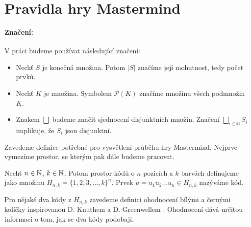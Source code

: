 \chapter{Pravidla hry Mastermind}

\subsubsection{Značení:}
V práci budeme používat následující značení:
\begin{itemize}
    \item Nechť $S$ je konečná množina. Potom $|S|$ značíme její mohutnost, tedy počet prvků.
    \item Nechť $K$ je množina. Symbolem $\mathcal{P}(K)$ značíme množinu všech podmnožin $K$.
    \item Znakem $\bigsqcup$ budeme značit sjednocení disjunktních množin. Značení $\bigsqcup_{i\in \mathbb{N}} S_i$ implikuje, že $S_i$ jsou disjunktní. 
\end{itemize}

Zavedeme definice potřebné pro vysvětlení průběhu hry Mastermind. Nejprve vymezíme prostor, se kterým pak dále budeme pracovat. 

\begin{definice}\label{def01:1}
  Nechť $n \in \mathbb{N} $, $k \in \mathbb{N} $. Potom prostor kódů o $n$ pozicích a $k$ barvách definujeme jako množinu $H_{n,k} = \{1, 2, 3, \dots, k\}^n$. Prvek $u = u_1u_2\dots u_n \in H_{n,k}$ nazýváme kód.
\end{definice}


Pro nějaké dva kódy z $H_{n,k}$ zavedeme definici ohodnocení bílými a černými kolíčky inspirovanou D. Knuthem \cite{donald_e__knuth_1977} a D. Greenwellem \cite{greenwell}. Ohodnocení dává určitou informaci o tom, jak se dva kódy podobají.


